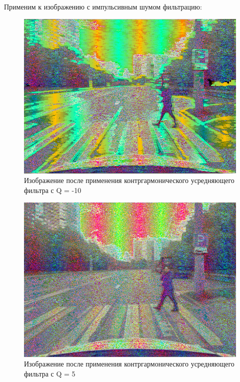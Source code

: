 Применим к изображению с импульсивным шумом фильтрацию:

\begin{figure}[ht]
    \includegraphics[width=\textwidth]{../outputs/image_quant_countergarmonic_filter_Q10.png}
    \caption{Изображение после применения контргармонического усредняющего фильтра с Q = -10}
    \label{fig:impulse_image}
\end{figure}

\begin{figure}[ht]
    \includegraphics[width=\textwidth]{../outputs/image_quant_countergarmonic_filter.png}
    \caption{Изображение после применения контргармонического усредняющего фильтра с Q = 5}
    \label{fig:impulse_image}
\end{figure}

